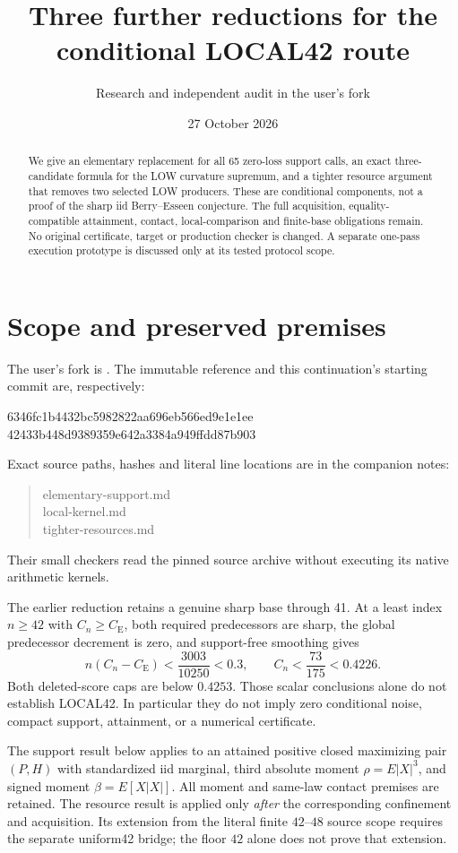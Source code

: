 \documentclass[11pt]{article}
\title{Three further reductions for the conditional LOCAL42 route}
\author{Research and independent audit in the user's fork}
\date{27 October 2026}
\newcommand{\CE}{C_{\mathrm E}}
\begin{document}
\maketitle
\begin{abstract}
We give an elementary replacement for all 65 zero-loss support calls, an
exact three-candidate formula for the LOW curvature supremum, and a tighter
resource argument that removes two selected LOW producers. These are
conditional components, not a proof of the sharp iid Berry--Esseen
conjecture. The full acquisition, equality-compatible attainment, contact,
local-comparison and finite-base obligations remain. No original certificate,
target or production checker is changed. A separate one-pass execution
prototype is discussed only at its tested protocol scope.
\end{abstract}

\section{Scope and preserved premises}
The user's fork is .
The immutable reference and this continuation's starting commit are,
respectively:
\begin{center}\small\ttfamily
6346fc1b4432bc5982822aa696eb566ed9e1e1ee\\
42433b448d9389359e642a3384a949ffdd87b903
\end{center}
Exact source paths, hashes and literal line locations are in the companion
notes:
\begin{quote}\ttfamily
elementary-support.md\\
local-kernel.md\\
tighter-resources.md
\end{quote}
Their small checkers read the pinned source
archive without executing its native arithmetic kernels.

The earlier reduction retains a genuine sharp base through 41. At a least
index $n\ge42$ with $C_n\ge\CE$, both required predecessors are sharp,
the global predecessor decrement is zero, and support-free smoothing gives
\[
 n(C_n-\CE)<\frac{3003}{10250}<0.3,\qquad
 C_n<\frac{73}{175}<0.4226.
\]
Both deleted-score caps are below $0.4253$. Those scalar conclusions alone
do not establish LOCAL42. In particular they do not imply zero conditional
noise, compact support, attainment, or a numerical certificate.

The support result below applies to an attained positive closed maximizing
pair $(P,H)$ with standardized iid marginal, third absolute moment
$\rho=E|X|^3$, and signed moment $\beta=E[X|X|]$. All moment and same-law
contact premises are retained. The resource result is applied only
\emph{after} the corresponding confinement and acquisition. Its extension
from the literal finite $42$--$48$ source scope requires the separate
uniform42 bridge; the floor $42$ alone does not prove that extension.
\end{document}
